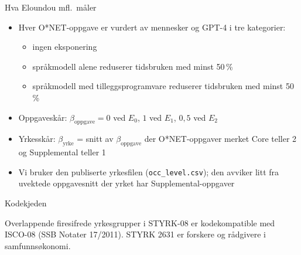 \begin{frame}{Hva Eloundou mfl.\ måler}
\begin{itemize}\setlength{\itemsep}{6pt}
  \item Hver O*NET-oppgave er vurdert av mennesker og GPT-4 i tre kategorier:
  \begin{itemize}
    \item[$E_0$] ingen eksponering
    \item[$E_1$] språkmodell alene reduserer tidsbruken med minst 50\,\%
    \item[$E_2$] språkmodell med tilleggsprogramvare reduserer tidsbruken med minst 50\,\%
  \end{itemize}
  \item Oppgaveskår:\quad
        $\beta_{\text{oppgave}} = 0$ ved $E_0$,\;\; $1$ ved $E_1$,\;\; $0{,}5$ ved $E_2$
  \item Yrkesskår: $\beta_{\text{yrke}}$ = snitt av $\beta_{\text{oppgave}}$ der O*NET-oppgaver merket Core teller 2 og Supplemental teller 1
  \item Vi bruker den publiserte yrkesfilen (\texttt{occ\_level.csv}); den avviker litt fra uvektede oppgavesnitt der yrket har Supplemental-oppgaver
\end{itemize}
\end{frame}

\begin{frame}{Kodekjeden}
\centering
{}

\vspace{1em}
Overlappende firesifrede yrkesgrupper i STYRK-08 er kodekompatible med ISCO-08 (SSB Notater 17/2011). STYRK 2631 er forskere og rådgivere i samfunnsøkonomi.
\end{frame}

